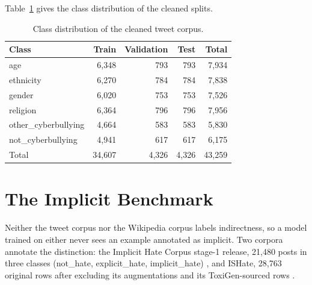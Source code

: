Table~\ref{tab:classes} gives the class distribution of the cleaned splits.

\begin{table}[htbp]
\centering
\small
\caption{Class distribution of the cleaned tweet corpus.}
\label{tab:classes}
\begin{tabular}{lrrrr}
\toprule
Class & Train & Validation & Test & Total \\
\midrule
age & 6,348 & 793 & 793 & 7,934 \\
ethnicity & 6,270 & 784 & 784 & 7,838 \\
gender & 6,020 & 753 & 753 & 7,526 \\
religion & 6,364 & 796 & 796 & 7,956 \\
other\_cyberbullying & 4,664 & 583 & 583 & 5,830 \\
not\_cyberbullying & 4,941 & 617 & 617 & 6,175 \\
\midrule
Total & 34,607 & 4,326 & 4,326 & 43,259 \\
\bottomrule
\end{tabular}
\end{table}

\section{The Implicit Benchmark}
\label{sec:4.2}
Neither the tweet corpus nor the Wikipedia corpus labels indirectness, so a model trained on either
never sees an example annotated as implicit. Two corpora annotate the distinction: the Implicit Hate
Corpus stage-1 release, 21,480 posts in three classes (not\_hate, explicit\_hate, implicit\_hate)
\cite{elsherief2021latent}, and ISHate, 28,763 original rows after excluding its augmentations and
its ToxiGen-sourced rows \cite{ocampo2023indepth}.

